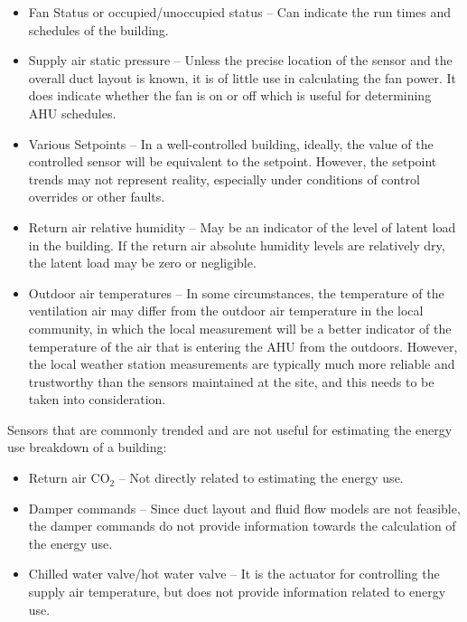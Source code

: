 \begin{itemize}
\item Fan Status or occupied/unoccupied status -- Can indicate the run times and schedules of the building.
\item Supply air static pressure -- Unless the precise location of the
    sensor and the overall duct layout is known, it is of little use in
    calculating the fan power. It does indicate whether the
    fan is on or off which is useful for determining AHU schedules.
\item Various Setpoints -- In a well-controlled building, ideally, the
    value of the controlled sensor will be equivalent to the setpoint.
    However, the setpoint trends may not represent reality, especially
    under conditions of control overrides or other faults.
\item Return air relative humidity -- May be an indicator of the level of latent load in the building. If the return air absolute humidity levels are relatively dry, the latent load may be zero or negligible. 
\item Outdoor air temperatures -- In some circumstances, the temperature
    of the ventilation air may differ from the outdoor air temperature in the
    local community, in which the local measurement will be a better
    indicator of the temperature of the air that is entering the AHU
    from the outdoors. However, the local weather station measurements
    are typically much more reliable and trustworthy than the sensors
    maintained at the site, and this needs to be taken into
    consideration.
\end{itemize}

Sensors that are commonly trended and are not useful for estimating the energy use breakdown of a building:
\begin{itemize}
\item Return air CO\(_2\) -- Not directly related to estimating the energy use.
\item Damper commands -- Since duct layout and fluid flow models are not feasible, the damper commands do not provide information towards the calculation of the energy use. 
\item Chilled water valve/hot water valve -- It is the actuator for controlling the supply air temperature, but does not provide information related to energy use.
\end{itemize}





